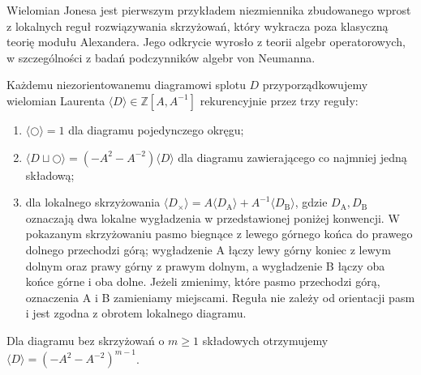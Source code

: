 Wielomian Jonesa jest pierwszym przykładem niezmiennika zbudowanego
wprost z lokalnych reguł rozwiązywania skrzyżowań, który wykracza
poza klasyczną teorię modułu Alexandera. Jego odkrycie wyrosło
z teorii algebr operatorowych, w szczególności z badań podczynników
algebr von Neumanna.

\begin{definicja}
Każdemu niezorientowanemu diagramowi splotu $D$ przyporządkowujemy
wielomian Laurenta $\langle D\rangle\in\mathbb Z[A,A^{-1}]$
rekurencyjnie przez trzy reguły:
\begin{enumerate}[label=(\roman*)]
\item $\langle\bigcirc\rangle=1$ dla diagramu pojedynczego okręgu;
\item $\langle D\sqcup\bigcirc\rangle=
(-A^2-A^{-2})\langle D\rangle$ dla diagramu zawierającego
co najmniej jedną składową;
\item dla lokalnego skrzyżowania
$\langle D_{\times}\rangle
=A\langle D_{\mathrm A}\rangle+A^{-1}\langle D_{\mathrm B}\rangle$,
gdzie $D_{\mathrm A},D_{\mathrm B}$ oznaczają dwa lokalne
wygładzenia w przedstawionej poniżej konwencji. W pokazanym
skrzyżowaniu pasmo biegnące z lewego górnego końca do prawego
dolnego przechodzi górą; wygładzenie A łączy lewy górny
koniec z lewym dolnym oraz prawy górny z prawym dolnym,
a wygładzenie B łączy oba końce górne i oba dolne.
Jeżeli zmienimy, które pasmo przechodzi górą, oznaczenia
A i B zamieniamy miejscami. Reguła nie zależy od orientacji
pasm i jest zgodna z obrotem lokalnego diagramu.
\end{enumerate}
Dla diagramu bez skrzyżowań o $m\geq1$ składowych otrzymujemy
$\langle D\rangle=(-A^2-A^{-2})^{m-1}$.
\end{definicja}

\begin{center}
\end{center}

